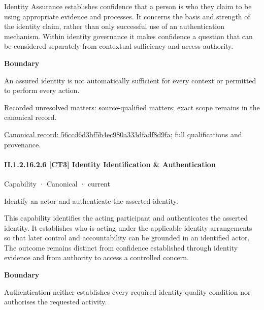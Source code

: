 Identity Assurance establishes confidence that a person is who they claim to be using appropriate evidence and processes. It concerns the basis and strength of the identity claim, rather than only successful use of an authentication mechanism. Within identity governance it makes confidence a question that can be considered separately from contextual sufficiency and access authority.



\textbf{Boundary}



An assured identity is not automatically sufficient for every context or permitted to perform every action.


{\small Recorded unresolved matters: source-qualified matters; exact scope remains in the canonical record.}\par
{\footnotesize \href{../../../../continuum/strategy/capability/56ccd6d3bf5b4ec980a333dfadf8d9fa.md}{Canonical record: 56ccd6d3bf5b4ec980a333dfadf8d9fa}; full qualifications and provenance.}\par
\paragraph*{II.1.2.16.2.6 [CT3] Identity Identification \& Authentication}
\label{navigation:II.1.2.16.2.6}

\label{element:ba4ad62548984d63ad75da3561566431}
{\small Capability · Canonical · current}\par

Identify an actor and authenticate the asserted identity.



This capability identifies the acting participant and authenticates the asserted identity. It establishes who is acting under the applicable identity arrangements so that later control and accountability can be grounded in an identified actor. The outcome remains distinct from confidence established through identity evidence and from authority to access a controlled concern.



\textbf{Boundary}



Authentication neither establishes every required identity-quality condition nor authorises the requested activity.


